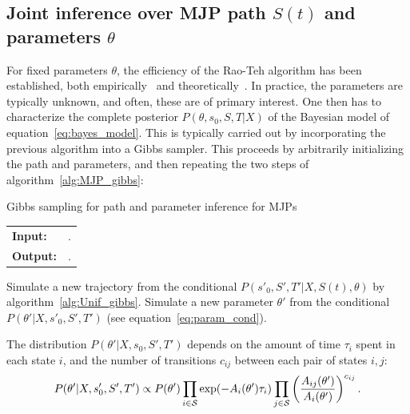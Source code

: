 \subsection{Joint inference over MJP path $S(t)$ and parameters $\theta$}
For fixed parameters $\theta$, the efficiency of the Rao-Teh algorithm has been established, both empirically~\citep{RaoTeh13} and theoretically~\citep{miasojedow2017}.
In practice, the parameters are typically unknown, and often, these are of primary interest. 
One then has to characterize the complete posterior $P(\theta, s_0, S, T|X)$ of the Bayesian model of equation~\eqref{eq:bayes_model}. 
This is typically carried out by incorporating the previous algorithm into a Gibbs sampler. 
This proceeds by arbitrarily initializing the path and parameters, and then repeating the two steps of algorithm~\ref{alg:MJP_gibbs}:
\begin{algorithm}[H]
  \caption{Gibbs sampling for path and parameter inference for MJPs}
   \label{alg:MJP_gibbs}
  \begin{tabular}{l l}
   \textbf{Input:  } %
                      & \text{The current MJP path $S(t) = (s_0, S, T)$, the current MJP parameters $\theta$}.\\ 
   \textbf{Output:  }& \text{New MJP trajectory $S' (t) = (s'_0, S', T')$ and 
                            parameters $\theta'$}.\\
   \hline
   \end{tabular}
   \begin{algorithmic}[1]
  \State  Simulate a new trajectory from the conditional 
  $P(s'_0, S', T'|X,S(t),\theta)$ by 
  algorithm~\ref{alg:Unif_gibbs}.
  \State Simulate a new parameter $\theta'$ from the conditional 
  $P(\theta'|X,s'_0,S',T')$ (see equation~\eqref{eq:param_cond}).
   \end{algorithmic}
\end{algorithm} 
\vspace{-.1in}
The distribution $P(\theta'|X,s_0,S',T')$ depends on %
the amount of time $\tau_i$ spent in each state $i$, and the number of transitions $c_{ij}$ between each pair of states $i,j$: 
\begin{align}
  \label{eq:param_cond}
  P(\theta'|X,s'_0,S',T') \propto P(\theta') \prod_{i \in {\mathcal S}} \exp(-A_i(\theta')\tau_i) 
  \prod_{j \in {\mathcal S}} \left(\frac{A_{ij}(\theta')}{A_i(\theta')}\right)^{c_{ij}}.
\end{align}
